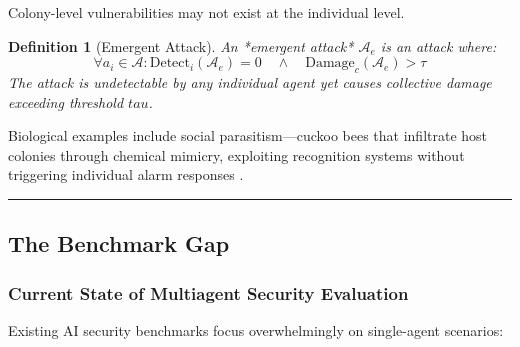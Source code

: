 \documentclass[
]{article}
\newtheorem{definition}{Definition}[section]
\begin{document}
Colony-level vulnerabilities may not exist at the individual level.

\begin{definition}[Emergent Attack]
\label{def:emergent-attack}
An *emergent attack* $\mathcal{A}_e$ is an attack where:
\begin{equation}
\label{eq:emergent-attack}
\forall a_i \in \mathcal{A}: \text{Detect}_i(\mathcal{A}_e) = 0 \quad \land \quad \text{Damage}_c(\mathcal{A}_e) > \tau
\end{equation}
The attack is undetectable by any individual agent yet causes collective damage exceeding threshold $tau$.
\end{definition}

Biological examples include social parasitism---cuckoo bees that
infiltrate host colonies through chemical mimicry, exploiting
recognition systems without triggering individual alarm responses
\citep{kilner2011cuckoos}.

\begin{center}\rule{0.5\linewidth}{0.5pt}\end{center}

\subsection{The Benchmark Gap}\label{sec:benchmark-gap}

\subsubsection{Current State of Multiagent Security
Evaluation}\label{sec:current-benchmarks}

Existing AI security benchmarks focus overwhelmingly on single-agent
scenarios:
\end{document}
